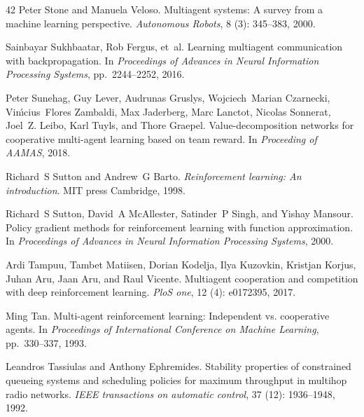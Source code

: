 \documentclass{article} %
\begin{document}
\begin{thebibliography}{42}
Peter Stone and Manuela Veloso.
\newblock Multiagent systems: A survey from a machine learning perspective.
\newblock \emph{Autonomous Robots}, 8 (3): 345--383, 2000.

Sainbayar Sukhbaatar, Rob Fergus, et~al.
\newblock Learning multiagent communication with backpropagation.
\newblock In \emph{Proceedings of Advances in Neural Information Processing
  Systems}, pp.\  2244--2252, 2016.

Peter Sunehag, Guy Lever, Audrunas Gruslys, Wojciech~Marian Czarnecki,
  Vin{\'{\i}}cius~Flores Zambaldi, Max Jaderberg, Marc Lanctot, Nicolas
  Sonnerat, Joel~Z. Leibo, Karl Tuyls, and Thore Graepel.
\newblock Value-decomposition networks for cooperative multi-agent learning
  based on team reward.
\newblock In \emph{Proceeding of {AAMAS}}, 2018.

Richard~S Sutton and Andrew~G Barto.
\newblock \emph{Reinforcement learning: An introduction}.
\newblock MIT press Cambridge, 1998.

Richard~S Sutton, David~A McAllester, Satinder~P Singh, and Yishay Mansour.
\newblock Policy gradient methods for reinforcement learning with function
  approximation.
\newblock In \emph{Proceedings of Advances in Neural Information Processing
  Systems}, 2000.

Ardi Tampuu, Tambet Matiisen, Dorian Kodelja, Ilya Kuzovkin, Kristjan Korjus,
  Juhan Aru, Jaan Aru, and Raul Vicente.
\newblock Multiagent cooperation and competition with deep reinforcement
  learning.
\newblock \emph{PloS one}, 12 (4): e0172395, 2017.

Ming Tan.
\newblock Multi-agent reinforcement learning: Independent vs. cooperative
  agents.
\newblock In \emph{Proceedings of International Conference on Machine
  Learning}, pp.\  330--337, 1993.

Leandros Tassiulas and Anthony Ephremides.
\newblock Stability properties of constrained queueing systems and scheduling
  policies for maximum throughput in multihop radio networks.
\newblock \emph{IEEE transactions on automatic control}, 37
  (12): 1936--1948, 1992.


\end{thebibliography}
\end{document}
